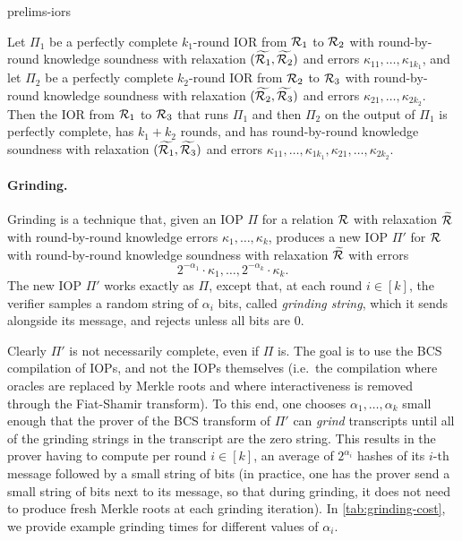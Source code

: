 \begin{lncsappendix}{prelims-iors}
\begin{lemma}\label{r:ior_compositoin}
Let $\Pi_1$ be a perfectly complete $k_1$-round IOR from $\mathcal{R}_1$ to $\mathcal{R}_2$ with round-by-round knowledge soundness with relaxation $(\widetilde{\mathcal{R}_1},\widetilde{\mathcal{R}_2})$ and errors $\kappa_{11},\ldots,\kappa_{1k_1}$, and let $\Pi_2$ be a perfectly complete $k_2$-round IOR from $\mathcal{R}_2$ to $\mathcal{R}_3$ with round-by-round knowledge soundness with relaxation $(\widetilde{\mathcal{R}_2},\widetilde{\mathcal{R}_3})$ and errors $\kappa_{21},\ldots,\kappa_{2k_2}$. Then the IOR from $\mathcal{R}_1$ to $\mathcal{R}_3$ that runs $\Pi_1$ and then $\Pi_2$ on the output of $\Pi_1$ is perfectly complete, has $k_1+k_2$ rounds, and has round-by-round knowledge soundness with relaxation $(\widetilde{\mathcal{R}_1},\widetilde{\mathcal{R}_3})$ and errors $\kappa_{11},\ldots,\kappa_{1k_1},\kappa_{21},\ldots,\kappa_{2k_2}$.
\end{lemma}


\paragraph{Grinding.}
 Grinding \cite{ethstark} is a technique that, given an IOP $\Pi$ for a relation $\mathcal{R}$ with relaxation $\widetilde{\mathcal{R}}$ with round-by-round knowledge errors $\kappa_1,\ldots, \kappa_k$,  produces a new IOP $\Pi'$ for $\mathcal{R}$ with round-by-round knowledge soundness with relaxation $\widetilde{\mathcal{R}}$ with errors $$2^{-\alpha_1}\cdot \kappa_1,\ldots, 2^{-\alpha_k}\cdot \kappa_k.$$ The new IOP $\Pi'$ works exactly as $\Pi$, except that, at each round $i\in [k]$, the verifier samples a random string of $\alpha_i$ bits, called \emph{grinding string}, which it sends alongside its message, and rejects unless all bits are $0$. 

 Clearly $\Pi'$ is not  necessarily complete, even if $\Pi$ is. The goal is to use the BCS compilation of IOPs, and not the IOPs themselves (i.e.\ the compilation where oracles are replaced by Merkle roots and where interactiveness is removed through the Fiat-Shamir transform). To this end, one chooses $\alpha_1, \ldots, \alpha_k$ small enough that the prover of the BCS transform of $\Pi'$ can \emph{grind} transcripts until all of the grinding strings in the transcript are the zero string. This results in the prover having to compute  per round $i\in [k]$, an average of $2^{\alpha_i}$  hashes of its $i$-th message followed by a small string of bits (in practice, one has the prover send a small string of bits next to its message, so that during grinding, it does not need to produce fresh Merkle roots at each grinding iteration). In \cref{tab:grinding-cost}, we provide example grinding times for different values of $\alpha_i$.
 

\end{lncsappendix}
